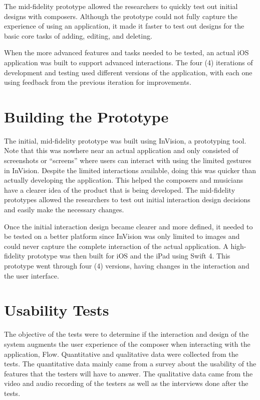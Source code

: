 		The mid-fidelity prototype allowed the researchers to quickly test out initial designs with composers. Although the prototype could not fully capture the experience of using an application, it made it faster to test out designs for the basic core tasks of adding, editing, and deleting. 

		When the more advanced features and tasks needed to be tested, an actual iOS application was built to support advanced interactions. The four (4) iterations of development and testing used different versions of the application, with each one using feedback from the previous iteration for improvements. 

	\section{Building the Prototype}

		The initial, mid-fidelity prototype was built using InVision, a prototyping tool. Note that this was nowhere near an actual application and only consisted of screenshots or ``screens'' where users can interact with using the limited gestures in InVision. Despite the limited interactions available, doing this was quicker than actually developing the application. This helped the composers and musicians have a clearer idea of the product that is being developed. The mid-fidelity prototypes allowed the researchers to test out initial interaction design decisions and easily make the necessary changes. 

		Once the initial interaction design became clearer and more defined, it needed to be tested on a better platform since InVision was only limited to images and could never capture the complete interaction of the actual application. A high-fidelity prototype was then built for iOS and the iPad using Swift 4. This prototype went through four (4) versions, having changes in the interaction and the user interface. 

	\section{Usability Tests}

		The objective of the tests were to determine if the interaction and design of the system augments the user experience of the composer when interacting with the application, Flow.  Quantitative and qualitative data were collected from the tests. The quantitative data mainly came from a survey about the usability of the features that the testers will have to answer. The qualitative data came from the video and audio recording of the testers as well as the interviews done after the tests. %

